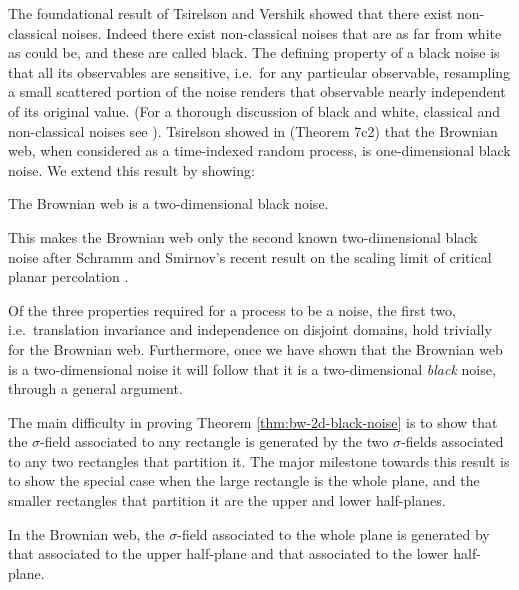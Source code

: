 {The foundational result of Tsirelson and Vershik \cite{tsirelson-vershik} showed that there
exist non-classical noises.  Indeed there exist non-classical noises
that are as far from white as could be, and these are called black.  The
defining property of a black noise is that all its observables are
sensitive, i.e.\ for any particular observable, resampling
a small scattered portion of the noise
renders that observable nearly independent of its original
value.  (For a thorough discussion of black and white, classical
and non-classical noises see \cite{tsirelson-nonclassical-stochastic-flows}).
Tsirelson showed in \cite{tsirelson-scaling-limit-noise-stability}
(Theorem 7c2) that the Brownian web, when considered as a time-indexed
random process, is one-dimensional black noise.  We extend this result
by showing:

\begin{theorem}
\label{thm:bw-2d-black-noise}
The Brownian web is a
two-dimensional black noise.
\end{theorem}

This makes the Brownian web only the second
known two-dimensional black noise after Schramm and Smirnov's
recent result on the scaling limit of critical planar
percolation \cite{schramm-smirnov}.

Of the three properties required for a process to be a noise, the
first two, i.e.\ translation invariance and independence on disjoint
domains, hold trivially for the Brownian web.  Furthermore, once we
have shown that the Brownian web is a two-dimensional noise it will
follow that it is a two-dimensional \emph{black} noise,
through a general argument.

The main difficulty in proving
Theorem \ref{thm:bw-2d-black-noise} is to show that the $\sigma$-field
associated to any rectangle is generated by the two $\sigma$-fields
associated to any two rectangles that partition it.
The major milestone towards this result is to show the special case
when the large rectangle is the whole plane, and the smaller
rectangles that partition it are the upper and lower half-planes.

\begin{theorem}
\label{thm:informal-recovering-from-half-planes}
In the Brownian web, the $\sigma$-field associated to the whole plane
is generated by that associated to the upper half-plane and that
associated to the lower half-plane.
\end{theorem}

}
